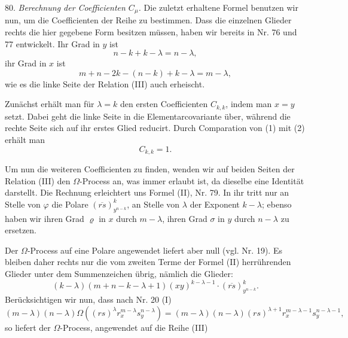
80. \textit{Berechnung der Coefficienten $C_\mu$.} Die zuletzt erhaltene Formel benutzen wir nun, um die Coefficienten der Reihe
zu bestimmen. Dass die einzelnen Glieder rechts die hier gegebene Form besitzen müssen, haben wir bereits in Nr. 76 und 77 entwickelt. Ihr Grad in $y$ ist
\[ n-k+k-\lambda = n-\lambda, \]
ihr Grad in $x$ ist
\[ m+n-2k-(n-k)+k-\lambda = m-\lambda, \]
wie es die linke Seite der Relation (III) auch erheischt.

Zunächst erhält man für $\lambda=k$ den ersten Coefficienten $C_{k,k}$, indem man $x=y$ setzt. Dabei geht die linke Seite in die Elementarcovariante
über, während die rechte Seite sich auf ihr erstes Glied
reducirt. Durch Comparation von (1) mit (2) erhält man
\[ C_{k,k} = 1. \]

Um nun die weiteren Coefficienten zu finden, wenden wir auf beiden Seiten der Relation (III) den $\Omega$-Process an, was immer erlaubt ist, da dieselbe eine Identität darstellt. Die Rechnung erleichtert uns Formel (II), Nr. 79. In ihr tritt nur an Stelle von $\varphi$ die Polare $(\overline{rs})_{y^{n-k}}^k$, an Stelle von $\lambda$ der Exponent $k-\lambda$; ebenso haben wir ihren Grad $\varrho$ in $x$ durch $m-\lambda$, ihren Grad $\sigma$ in $y$ durch $n-\lambda$ zu ersetzen.

Der $\Omega$-Process auf eine Polare angewendet liefert aber null (vgl. Nr. 19). Es bleiben daher rechts nur die vom zweiten Terme der Formel (II) herrührenden Glieder unter dem Summenzeichen übrig, nämlich die Glieder:
\[ (k-\lambda)(m+n-k-\lambda+1)(xy)^{k-\lambda-1}\cdot(\overline{rs})_{y^{n-k}}^k. \]
Berücksichtigen wir nun, dass nach Nr. 20 (I)
\[ (m-\lambda)(n-\lambda)\Omega\!\left((rs)^\lambda r_x^{m-\lambda} s_y^{n-\lambda}\right) = (m-\lambda)(n-\lambda)(rs)^{\lambda+1} r_x^{m-\lambda-1} s_y^{n-\lambda-1}, \]
so liefert der $\Omega$-Process, angewendet auf die Reihe (III)


